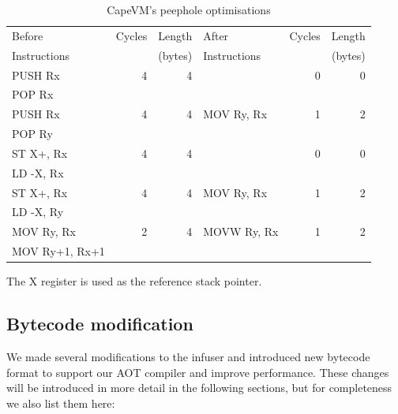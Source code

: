 \begin{table}
\caption{CapeVM's peephole optimisations}
\label{tbl-CapeVM-peephole}
    \begin{threeparttable}
    \begin{tabular}{lrrlrr}
    \toprule
    Before         & Cycles & Length  & After        & Cycles & Length \\
    Instructions   &        & (bytes) & Instructions &        & (bytes) \\
    \midrule
    \midrule
    PUSH Rx        & 4      & 4       &              & 0      & 0 \\
    POP Rx         &        &         &              &        & \\
    \midrule
    PUSH Rx        & 4      & 4       & MOV Ry, Rx   & 1      & 2 \\
    POP Ry         &        &         &              &        & \\
    \midrule
    ST X+, Rx      & 4      & 4       &              & 0      & 0 \\
    LD -X, Rx      &        &         &              &        & \\
    \midrule
    ST X+, Rx      & 4      & 4       & MOV Ry, Rx   & 1      & 2 \\
    LD -X, Ry      &        &         &              &        & \\
    \midrule
    MOV Ry, Rx     & 2      & 4       & MOVW Ry, Rx  & 1      & 2 \\
    MOV Ry+1, Rx+1 &        &         &              &        & \\
    \bottomrule
    \end{tabular}
    \begin{tablenotes}
    \item The X register is used as the reference stack pointer.
    \end{tablenotes}
    \end{threeparttable}
\end{table}


\subsection{Bytecode modification}
\label{sec-vm-design-bytecode-modifications}
We made several modifications to the infuser and introduced new bytecode format to support our AOT compiler and improve performance. These changes will be introduced in more detail in the following sections, but for completeness we also list them here:

